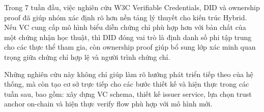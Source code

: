 Trong 7 tuần đầu, việc nghiên cứu W3C Verifiable Credentials, DID và ownership proof đã giúp nhóm xác định rõ hơn nền tảng lý thuyết cho kiến trúc Hybrid. Nếu VC cung cấp mô hình biểu diễn chứng chỉ phù hợp hơn với bản chất của một chứng nhận học thuật, thì DID đóng vai trò là định danh số phi tập trung cho các thực thể tham gia, còn ownership proof giúp bổ sung lớp xác minh quan trọng giữa chứng chỉ hợp lệ và người trình chứng chỉ.

Những nghiên cứu này không chỉ giúp làm rõ hướng phát triển tiếp theo của hệ thống, mà còn tạo cơ sở trực tiếp cho các bước thiết kế và hiện thực trong các tuần sau, bao gồm: xây dựng VC schema, thiết kế issuer service, lựa chọn trust anchor on-chain và hiện thực verify flow phù hợp với mô hình mới.